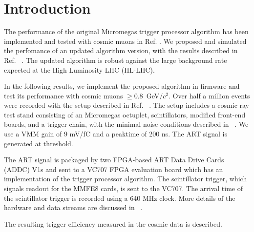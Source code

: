 \section{Introduction}
\label{sec:intro}
The performance of the original Micromegas trigger processor algorithm has been implemented and tested with cosmic muons in Ref. \cite{mmtp}. We proposed and simulated the perfomance of an updated algorithm version, with the results described in Ref. ~\cite{tpsim}. The updated algorithm is robust against the large background rate expected at the High Luminosity LHC (HL-LHC). 
\par In the following results, we implement the proposed algorithm in firmware and test its performance with cosmic muons $\ge 0.8$~GeV$/c^2$. Over half a million events were recorded with the setup described in Ref. ~\cite{noisy,noiseless}. The setup includes a cosmic ray test stand consisting of an Micromegas octuplet, scintillators, modified front-end boards, and a trigger chain, with the minimal noise conditions described in ~\cite{utpc}. We use a VMM gain of 9 mV/fC and a peaktime of 200 ns. The ART signal is generated at threshold.
\par The ART signal is packaged by two FPGA-based ART Data Drive Cards (ADDC) V1s and sent to a VC707 FPGA evaluation board which has an implementation of the trigger processor algorithm. The scintillator trigger, which signals readout for the MMFE8 cards, is sent to the VC707. The arrival time of the scintillator trigger is recorded using a 640 MHz clock. More details of the hardware and data streams are discussed in ~\cite{mmtp}. 
\par The resulting trigger efficiency measured in the cosmic data is described.

